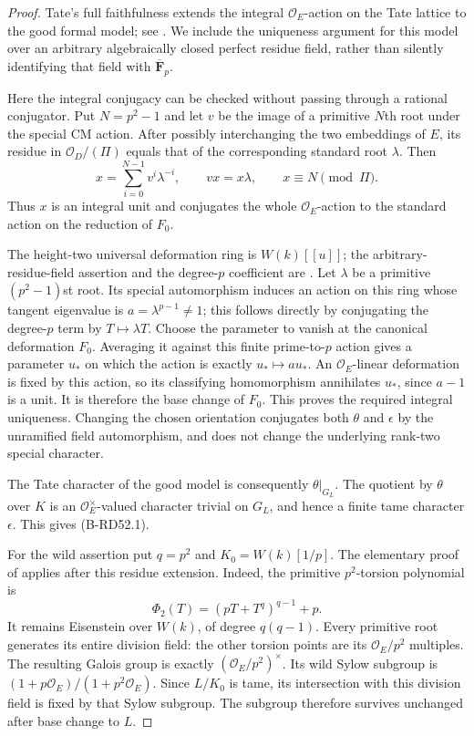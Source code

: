 \begin{proof}
Tate's full faithfulness extends the integral
$\mathcal O_E$-action on the Tate lattice to the good formal
model; see \cite[Theorem~4 and Corollaries~1--2, p.~181]
{Tate1967PDivisible}. We include the uniqueness argument for
this model over an arbitrary algebraically closed perfect
residue field, rather than silently identifying that field
with $\overline{\mathbf F}_p$.

Here the integral conjugacy can be checked without passing
through a rational conjugator. Put $N=p^2-1$ and let $v$
be the image of a primitive $N$th root under the special
CM action. After possibly interchanging the two embeddings
of $E$, its residue in $\mathcal O_D/(\Pi)$ equals that of
the corresponding standard root $\lambda$. Then
\[
 x=\sum_{i=0}^{N-1}v^i\lambda^{-i},\qquad
 vx=x\lambda,\qquad x\equiv N\pmod\Pi.
\]
Thus $x$ is an integral unit and conjugates the whole
$\mathcal O_E$-action to the standard action on the
reduction of $F_0$.

The height-two universal deformation ring is $W(k)[[u]]$;
the arbitrary-residue-field assertion and the degree-$p$
coefficient are \cite[Proposition~5.7 and equations~(5.3)--(5.8);
Proposition~12.10 and its full proof]{HopkinsGross1994Bundles}.
Let $\lambda$ be a primitive $(p^2-1)$st root. Its special
automorphism induces an action on this ring whose tangent
eigenvalue is $a=\lambda^{p-1}\ne1$; this follows directly
by conjugating the degree-$p$ term by $T\mapsto\lambda T$.
Choose the parameter to vanish at the canonical deformation
$F_0$. Averaging it against this finite prime-to-$p$ action
gives a parameter $u_*$ on which the action is exactly
$u_*\mapsto a u_*$. An $\mathcal O_E$-linear deformation
is fixed by this action, so its classifying homomorphism
annihilates $u_*$, since $a-1$ is a unit. It is therefore
the base change of $F_0$. This proves the required integral
uniqueness. Changing the chosen orientation conjugates both
$\theta$ and $\epsilon$ by the unramified field automorphism,
and does not change the underlying rank-two special character.

The Tate character of the good model is consequently
$\theta|_{G_L}$. The quotient by $\theta$ over $K$ is an
$\mathcal O_E^\times$-valued character trivial on $G_L$,
and hence a finite tame character $\epsilon$. This gives
(B-RD52.1).

For the wild assertion put $q=p^2$ and $K_0=W(k)[1/p]$.
The elementary proof of
\cite[Theorem~2(b),(d),(e) and full proof, pp.~383--384]
{LubinTate1965FormalCM} applies after this residue extension.
Indeed, the primitive $p^2$-torsion polynomial is
\[
                 \Phi_2(T)=(pT+T^q)^{q-1}+p.           \tag{B-RD52.2}
\]
It remains Eisenstein over $W(k)$, of degree $q(q-1)$.
Every primitive root generates its entire division field:
the other torsion points are its $\mathcal O_E/p^2$ multiples.
The resulting Galois group is exactly
$(\mathcal O_E/p^2)^\times$. Its wild Sylow subgroup is
$(1+p\mathcal O_E)/(1+p^2\mathcal O_E)$.
Since $L/K_0$ is tame, its intersection with this division
field is fixed by that Sylow subgroup. The subgroup therefore
survives unchanged after base change to $L$.
\end{proof}

